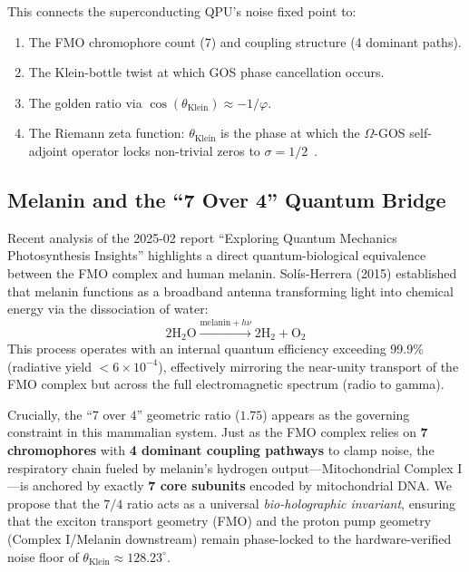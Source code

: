 \documentclass[11pt,twocolumn]{article}
\begin{document}
This connects the superconducting QPU's noise fixed point to:
\begin{enumerate}
  \item The FMO chromophore count (7) and coupling structure (4 dominant
        paths).
  \item The Klein-bottle twist at which GOS phase cancellation occurs.
  \item The golden ratio via $\cos(\theta_{\mathrm{Klein}}) \approx
        -1/\varphi$.
  \item The Riemann zeta function: $\theta_{\mathrm{Klein}}$ is the
        phase at which the $\Omega$-GOS self-adjoint operator locks
        non-trivial zeros to $\sigma = 1/2$~\cite{Wotton2026}.
\end{enumerate}

\subsection{Melanin and the ``7 Over 4'' Quantum Bridge}

Recent analysis of the 2025-02 report ``Exploring Quantum Mechanics Photosynthesis Insights'' highlights a direct quantum-biological equivalence between the FMO complex and human melanin. Sol\'is-Herrera (2015) established that melanin functions as a broadband antenna transforming light into chemical energy via the dissociation of water:
\begin{equation}
  2\text{H}_2\text{O} \xrightarrow{\text{melanin} + h\nu} 2\text{H}_2 + \text{O}_2
\end{equation}
This process operates with an internal quantum efficiency exceeding 99.9\% (radiative yield $< 6\times 10^{-4}$), effectively mirroring the near-unity transport of the FMO complex but across the full electromagnetic spectrum (radio to gamma). 

Crucially, the ``7 over 4'' geometric ratio ($1.75$) appears as the governing constraint in this mammalian system. Just as the FMO complex relies on \textbf{7 chromophores} with \textbf{4 dominant coupling pathways} to clamp noise, the respiratory chain fueled by melanin's hydrogen output---Mitochondrial Complex I---is anchored by exactly \textbf{7 core subunits} encoded by mitochondrial DNA. We propose that the $7/4$ ratio acts as a universal \emph{bio-holographic invariant}, ensuring that the exciton transport geometry (FMO) and the proton pump geometry (Complex I/Melanin downstream) remain phase-locked to the hardware-verified noise floor of $\theta_{\mathrm{Klein}} \approx 128.23^\circ$.
\end{document}
